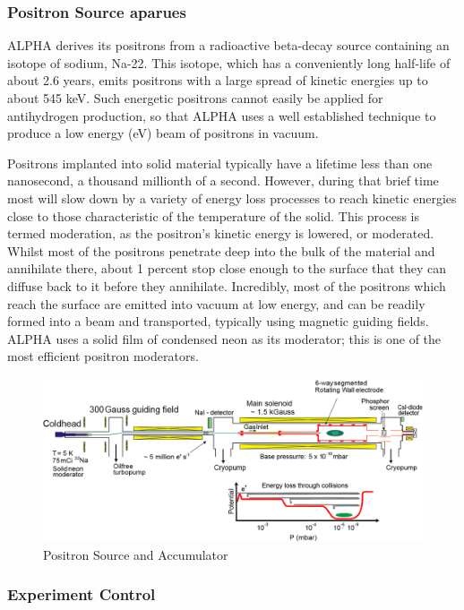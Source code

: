 \documentclass{article}
\begin{document}
\subsubsection{Positron Source aparues}

ALPHA derives its positrons from a radioactive beta-decay source containing an isotope of sodium, Na-22. This isotope, which has a conveniently long half-life of about 2.6 years, emits positrons with a large spread of kinetic energies up to about 545 keV. Such energetic positrons cannot easily be applied for antihydrogen production, so that ALPHA uses a well established technique to produce a low energy (eV) beam of positrons in vacuum.

Positrons implanted into solid material typically have a lifetime less than one nanosecond, a thousand millionth of a second. However, during that brief time most will slow down by a variety of energy loss processes to reach kinetic energies close to those characteristic of the temperature of the solid. This process is termed moderation, as the positron’s kinetic energy is lowered, or moderated. Whilst most of the positrons penetrate deep into the bulk of the material and annihilate there, about 1 percent
 stop close enough to the surface that they can diffuse back to it before they annihilate. Incredibly, most of the positrons which reach the surface are emitted into vacuum at low energy, and can be readily formed into a beam and transported, typically using magnetic guiding fields. ALPHA uses a solid film of condensed neon as its moderator; this is one of the most efficient positron moderators.
 
 
\begin{figure}[h]
\centering
\includegraphics[width=130 mm]{fullsetup}
\caption{Positron Source and Accumulator}
\end{figure}

\subsubsection{Experiment Control}
\end{document}
